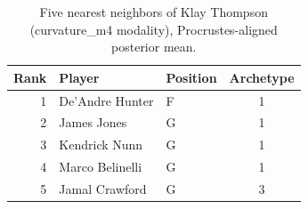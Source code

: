 \begin{table}[htbp]
  \centering\small
  \begin{tabular}{rllc}
    \toprule
    Rank & Player & Position & Archetype \\
    \midrule
    1 & De'Andre Hunter & F & 1 \\
    2 & James Jones & G & 1 \\
    3 & Kendrick Nunn & G & 1 \\
    4 & Marco Belinelli & G & 1 \\
    5 & Jamal Crawford & G & 3 \\
    \bottomrule
  \end{tabular}
  \caption{Five nearest neighbors of Klay Thompson (curvature_m4 modality), Procrustes-aligned posterior mean.}
  \label{tab:Klay_Thompson_neighbors_curvature_m4}
\end{table}

